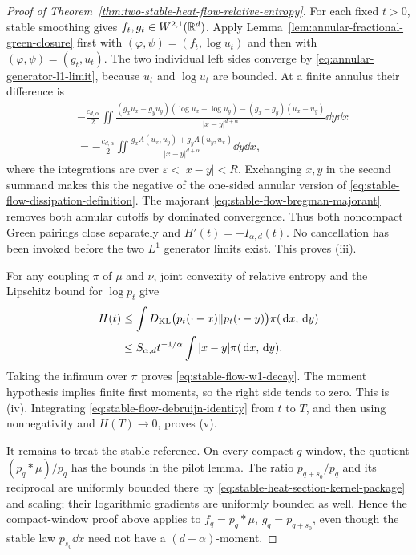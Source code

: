 \begin{proof}[Proof of Theorem~\ref{thm:two-stable-heat-flow-relative-entropy}]
For each fixed \(t>0\), stable smoothing gives
\(f_t,g_t\in W^{2,1}(\mathbb{R}^d)\).  Apply
Lemma~\ref{lem:annular-fractional-green-closure} first with
\((\varphi,\psi)=(f_t,\log u_t)\) and then with
\((\varphi,\psi)=(g_t,u_t)\).  The two individual left sides converge by
\eqref{eq:annular-generator-l1-limit}, because \(u_t\) and
\(\log u_t\) are bounded.  At a finite annulus their difference is
\begin{align*}
 &-\frac{c_{d,\alpha}}2\iint
 \frac{(g_xu_x-g_yu_y)(\log u_x-\log u_y)
 -(g_x-g_y)(u_x-u_y)}{|x-y|^{d+\alpha}}\dd y\dd x\\
 &=-\frac{c_{d,\alpha}}2\iint
 \frac{g_x\Lambda(u_x,u_y)+g_y\Lambda(u_y,u_x)}
 {|x-y|^{d+\alpha}}\dd y\dd x,
\end{align*}
where the integrations are over
\(\varepsilon<|x-y|<R\).  Exchanging \(x,y\) in the second summand makes
this the negative of the one-sided annular version of
\eqref{eq:stable-flow-dissipation-definition}.  The majorant
\eqref{eq:stable-flow-bregman-majorant} removes both annular cutoffs by
dominated convergence.  Thus both noncompact Green pairings close
separately and
\(H'(t)=-I_{\alpha,d}(t)\).  No cancellation has been invoked before the
two \(L^1\) generator limits exist.  This proves \textup{(iii)}.

For any coupling \(\pi\) of \(\mu\) and \(\nu\), joint convexity of relative
entropy and the Lipschitz bound for \(\log p_t\) give
\begin{align*}
 H(t)
 &\le\int D_{\rm KL}
 \bigl(p_t(\mathord\cdot-x)\|p_t(\mathord\cdot-y)\bigr)
 \pi(\,\mathrm{d} x,\,\mathrm{d} y)\\
 &\le S_{\alpha,d}t^{-1/\alpha}
 \int|x-y|\pi(\,\mathrm{d} x,\,\mathrm{d} y).
\end{align*}
Taking the infimum over \(\pi\) proves \eqref{eq:stable-flow-w1-decay}.
The moment hypothesis implies finite first moments, so the right side tends
to zero.  This is \textup{(iv)}.  Integrating
\eqref{eq:stable-flow-debruijn-identity} from \(t\) to \(T\), and then using
nonnegativity and \(H(T)\to0\), proves \textup{(v)}.

It remains to treat the stable reference.  On every compact \(q\)-window,
the quotient \((p_q*\mu)/p_q\) has the bounds in the pilot lemma.  The ratio
\(p_{q+s_0}/p_q\) and its reciprocal are uniformly bounded there by
\eqref{eq:stable-heat-section-kernel-package} and scaling; their logarithmic
gradients are uniformly bounded as well.  Hence the compact-window proof
above applies to \(f_q=p_q*\mu\), \(g_q=p_{q+s_0}\), even though the stable
law \(p_{s_0}\dd x\) need not have a \((d+\alpha)\)-moment.


\end{proof}
